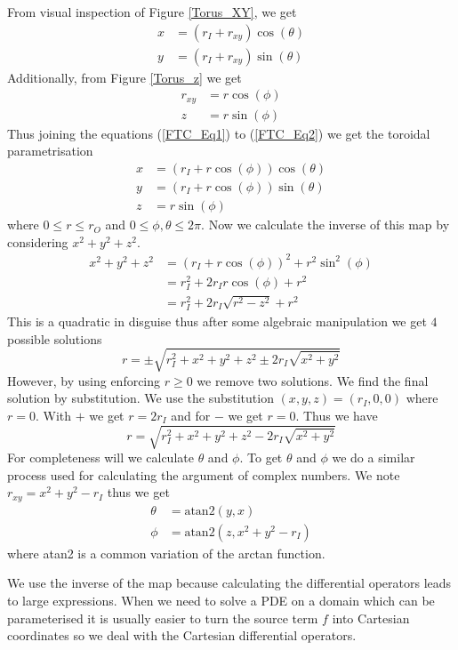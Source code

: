 \documentclass[12pt]{ociamthesis}
\begin{document}
From visual inspection of Figure \ref{Torus_XY}, we get 
\begin{align} \label{FTC_Eq1}
x &= (r_I + r_{xy})\cos(\theta)\\
y &= (r_I + r_{xy})\sin(\theta)
\end{align}
Additionally, from Figure \ref{Torus_z} we get 
\begin{align}
r_{xy}& = r \cos(\phi) \\ \label{FTC_Eq2}
z &= r \sin(\phi)
\end{align}
Thus joining the equations (\ref{FTC_Eq1}) to (\ref{FTC_Eq2}) we get the toroidal parametrisation
\begin{align}
x &= (r_I + r\cos(\phi))\cos(\theta) \\
y &= (r_I + r \cos(\phi))\sin(\theta) \\
z &= r \sin(\phi)
\end{align}
where $0\leq r \leq r_O$ and $0 \leq \phi, \theta \leq 2 \pi$. Now we calculate the inverse of this map by considering $x^2 + y^2 + z^2$. 
\begin{align}
x^2 + y^2 + z^2 &= (r_I + r \cos(\phi))^2 + r^2\sin^2(\phi)\\
&= r_I^2 + 2r_Ir\cos(\phi) + r^2\\
&= r_I^2 +2r_I \sqrt{r^2-z^2} + r^2
\end{align}
This is a quadratic in disguise thus after some algebraic manipulation we get $4$ possible solutions
\begin{equation}
r = \pm\sqrt{r_I^2 + x^2 + y^2 + z^2 \pm 2r_I\sqrt{x^2+y^2}}
\end{equation}
However, by using enforcing $r\geq0$ we remove two solutions. We find the final solution by substitution. We use the substitution $(x, y, z) = (r_I, 0, 0)$ where $r=0$. With $+$ we get $r=2r_I$ and for $-$ we get $r = 0$. Thus we have 
\begin{equation}
r = \sqrt{r_I^2 + x^2 + y^2 + z^2 - 2r_I\sqrt{x^2+y^2}}
\end{equation}
For completeness will we calculate $\theta$ and $\phi$. To get $\theta$ and $\phi$ we do a similar process used for calculating the argument of complex numbers. We note $r_{xy}=x^2+y^2-r_I$ thus we get
\begin{align}
\theta &= \text{atan2}(y, x) \\
\phi &= \text{atan2}(z, x^2+y^2-r_{I})
\end{align}
where atan2 is a common variation of the arctan function.

We use the inverse of the map because calculating the differential operators leads to large expressions. When we need to solve a PDE on a domain which can be parameterised it is usually easier to turn the source term $f$ into Cartesian coordinates so we deal with the Cartesian differential operators.
\end{document}
